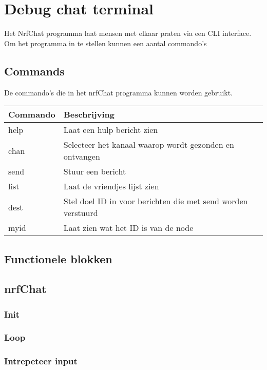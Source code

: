 \section{Debug chat terminal}

Het NrfChat programma laat mensen met elkaar praten via een CLI interface. Om het programma in te stellen kunnen een aantal commando's

\subsection{Commands}
De commando's die in het nrfChat programma kunnen worden gebruikt.

\begin{table}[h]
    \begin{tabular}{|l|l|} \hline
        \textbf{Commando} & \textbf{Beschrijving} \\\hline
        help & Laat een hulp bericht zien \\\hline
        chan & Selecteer het kanaal waarop wordt gezonden en ontvangen\\\hline
        send & Stuur een bericht \\\hline
        list & Laat de vriendjes lijst zien\\\hline
        dest & Stel doel ID in voor berichten die met send worden verstuurd \\\hline
        myid & Laat zien wat het ID is van de node \\\hline
    \end{tabular}
\end{table}

\subsection{Functionele blokken}

\subsection{nrfChat}
    \subsubsection{Init}
    \subsubsection{Loop}
    \subsubsection{Intrepeteer input}
